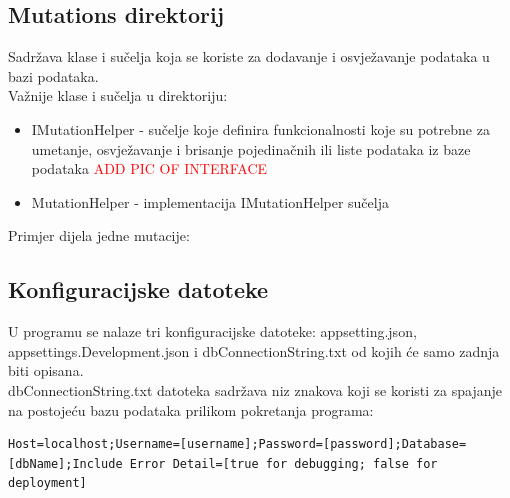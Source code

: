 \documentclass[zavrsnirad]{fer}
\begin{document}
\subsection{Mutations direktorij}
Sadržava klase i sučelja koja se koriste za dodavanje i osvježavanje podataka u bazi podataka.
\\Važnije klase i sučelja u direktoriju:
\begin{itemize}
	\item IMutationHelper - sučelje koje definira funkcionalnosti koje su potrebne za umetanje, osvježavanje i brisanje pojedinačnih ili liste podataka iz baze podataka \textcolor{red}{ADD PIC OF INTERFACE}
	\item MutationHelper - implementacija IMutationHelper sučelja
\end{itemize}
Primjer dijela jedne mutacije:


\subsection{Konfiguracijske datoteke}
U programu se nalaze tri konfiguracijske datoteke: appsetting.json, appsettings.Development.json i dbConnectionString.txt od kojih će samo zadnja biti opisana.
\\dbConnectionString.txt datoteka sadržava niz znakova koji se koristi za spajanje na postojeću bazu podataka prilikom pokretanja programa:
\begin{lstlisting}[title=dbConnectionString.txt]
	Host=localhost;Username=[username];Password=[password];Database=[dbName];Include Error Detail=[true for debugging; false for deployment]
\end{lstlisting}
\end{document}
